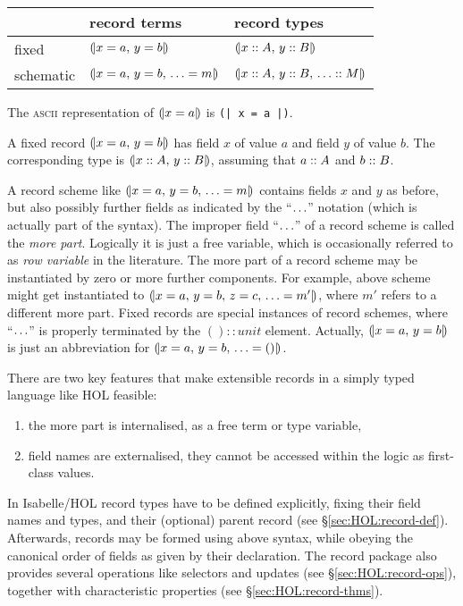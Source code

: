 \begin{center}
\begin{tabular}{l|l|l}
  & record terms & record types \\ \hline
  fixed & $\mathopen{(\!|} x = a\mathpunct{,\,} y = b \mathclose{|\!)}$ & $\mathopen{(\!|} x \mathrel{::} A\mathpunct{,\,} y \mathrel{::} B \mathclose{|\!)}$ \\
  schematic & $\mathopen{(\!|} x = a\mathpunct{,\,} y = b\mathpunct{,\,} \ldots = m \mathclose{|\!)}$ &
    $\mathopen{(\!|} x \mathrel{::} A\mathpunct{,\,} y \mathrel{::} B\mathpunct{,\,} \ldots \mathrel{::} M \mathclose{|\!)}$ \\
\end{tabular}
\end{center}

\noindent The \textsc{ascii} representation of $\mathopen{(\!|} x = a \mathclose{|\!)}$ is \texttt{(| x = a |)}.

A fixed record $\mathopen{(\!|} x = a\mathpunct{,\,} y = b \mathclose{|\!)}$ has field $x$ of value $a$ and field
$y$ of value $b$.  The corresponding type is $\mathopen{(\!|} x \mathrel{::} A\mathpunct{,\,} y \mathrel{::} B \mathclose{|\!)}$,
assuming that $a \mathrel{::} A$ and $b \mathrel{::} B$.

A record scheme like $\mathopen{(\!|} x = a\mathpunct{,\,} y = b\mathpunct{,\,} \ldots = m \mathclose{|\!)}$ contains fields
$x$ and $y$ as before, but also possibly further fields as indicated by the
``$\ldots$'' notation (which is actually part of the syntax).  The improper
field ``$\ldots$'' of a record scheme is called the \emph{more part}.
Logically it is just a free variable, which is occasionally referred to as
\emph{row variable} in the literature.  The more part of a record scheme may
be instantiated by zero or more further components.  For example, above scheme
might get instantiated to $\mathopen{(\!|} x = a\mathpunct{,\,} y = b\mathpunct{,\,} z = c\mathpunct{,\,} \ldots = m' \mathclose{|\!)}$,
where $m'$ refers to a different more part.  Fixed records are special
instances of record schemes, where ``$\ldots$'' is properly terminated by the
$() :: unit$ element.  Actually, $\mathopen{(\!|} x = a\mathpunct{,\,} y = b \mathclose{|\!)}$ is just an
abbreviation for $\mathopen{(\!|} x = a\mathpunct{,\,} y = b\mathpunct{,\,} \ldots = () \mathclose{|\!)}$.

\medskip

There are two key features that make extensible records in a simply typed
language like HOL feasible:
\begin{enumerate}
\item the more part is internalised, as a free term or type variable,
\item field names are externalised, they cannot be accessed within the logic
  as first-class values.
\end{enumerate}

\medskip

In Isabelle/HOL record types have to be defined explicitly, fixing their field
names and types, and their (optional) parent record (see
\S\ref{sec:HOL:record-def}).  Afterwards, records may be formed using above
syntax, while obeying the canonical order of fields as given by their
declaration.  The record package also provides several operations like
selectors and updates (see \S\ref{sec:HOL:record-ops}), together with
characteristic properties (see \S\ref{sec:HOL:record-thms}).

